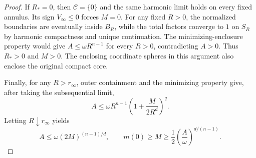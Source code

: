 \begin{proof}
If $R_*=0$, then $\mathcal C=\{0\}$ and the same harmonic limit holds on every
fixed annulus. Its sign $V_\infty\leq0$ forces $M=0$.
For any fixed $R>0$, the normalized boundaries are eventually inside
$B_R$, while the total factors converge to $1$ on $S_R$ by harmonic
compactness and unique continuation. The minimizing-enclosure property
would give $A\leq\omega R^{n-1}$ for every $R>0$, contradicting
$A>0$. Thus $R_*>0$ and $M>0$. The enclosing coordinate spheres in
this argument also enclose the original compact core.

Finally, for any $R>r_\infty$, outer containment and the minimizing
property give, after taking the subsequential limit,
\[
 A\leq\omega R^{n-1}
       \left(1+\frac{M}{2R^d}\right)^q.
\]
Letting $R\downarrow r_\infty$ yields
\[
 A\leq\omega(2M)^{(n-1)/d},\qquad
 m(0)\geq M\geq\frac12
        \left(\frac{A}{\omega}\right)^{d/(n-1)}.
\]
\end{proof}
